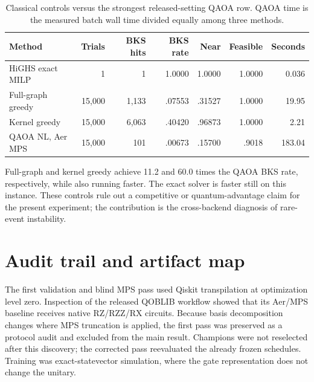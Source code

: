 \documentclass[10pt]{article}
\begin{document}
\begin{table}[h]
\centering
\caption{Classical controls versus the strongest released-setting QAOA row.
QAOA time is the measured batch wall time divided equally among three methods.}
\label{tab:classical}
\small
\begin{tabular}{lrrrrrr}
\toprule
Method & Trials & BKS hits & BKS rate & Near & Feasible & Seconds \\
\midrule
HiGHS exact MILP & 1 & 1 & 1.0000 & 1.0000 & 1.0000 & 0.036 \\
Full-graph greedy & 15,000 & 1,133 & .07553 & .31527 & 1.0000 & 19.95 \\
Kernel greedy & 15,000 & 6,063 & .40420 & .96873 & 1.0000 & 2.21 \\
QAOA NL, Aer MPS & 15,000 & 101 & .00673 & .15700 & .9018 & 183.04 \\
\bottomrule
\end{tabular}
\end{table}

Full-graph and kernel greedy achieve 11.2 and 60.0 times the QAOA BKS rate,
respectively, while also running faster.  The exact solver is faster still on
this instance.  These controls rule out a competitive or quantum-advantage
claim for the present experiment; the contribution is the cross-backend
diagnosis of rare-event instability.

\section{Audit trail and artifact map}

The first validation and blind MPS pass used Qiskit transpilation at
optimization level zero. Inspection of the released QOBLIB workflow showed
that its Aer/MPS baseline receives native RZ/RZZ/RX circuits. Because basis
decomposition changes where MPS truncation is applied, the first pass was
preserved as a protocol audit and excluded from the main result. Champions
were not reselected after this discovery; the corrected pass reevaluated the
already frozen schedules. Training was exact-statevector simulation, where the
gate representation does not change the unitary.
\end{document}

